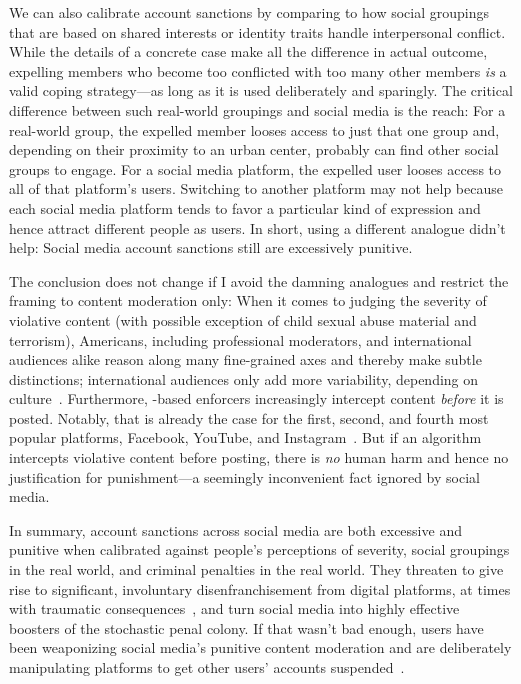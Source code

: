 We can also calibrate account sanctions by comparing to how social groupings
that are based on shared interests or identity traits handle interpersonal
conflict. While the details of a concrete case make all the difference in actual
outcome, expelling members who become too conflicted with too many other members
\emph{is} a valid coping strategy---as long as it is used deliberately and
sparingly. The critical difference between such real-world groupings and social
media is the reach: For a real-world group, the expelled member looses access to
just that one group and, depending on their proximity to an urban center,
probably can find other social groups to engage. For a social media platform,
the expelled user looses access to all of that platform's users. Switching to
another platform may not help because each social media platform tends to favor
a particular kind of expression and hence attract different people as users. In
short, using a different analogue didn't help: Social media account sanctions
still are excessively punitive.

The conclusion does not change if I avoid the damning analogues and restrict
the framing to content moderation only: When it comes to judging the severity of
violative content (with possible exception of child sexual abuse material and
terrorism), Americans, including professional moderators, and international
audiences alike reason along many fine-grained axes and thereby make subtle
distinctions; international audiences only add more variability, depending on
culture~\cite{JiangScheuermanea2021,ScheuermanJiangea2021}. Furthermore,
\AI-based enforcers increasingly intercept content \emph{before} it is posted.
Notably, that is already the case for the first, second, and fourth most popular
platforms, Facebook, YouTube, and Instagram~\cite{Lua2022}. But if an algorithm
intercepts violative content before posting, there is \emph{no} human harm and
hence no justification for punishment---a seemingly inconvenient fact ignored
by social media.

In summary, account sanctions across social media are both excessive and
punitive when calibrated against people's perceptions of severity, social
groupings in the real world, and criminal penalties in the real world. They
threaten to give rise to significant, involuntary disenfranchisement from
digital platforms, at times with traumatic consequences~\cite{Hill2022}, and
turn social media into highly effective boosters of the stochastic penal colony.
If that wasn't bad enough, users have been weaponizing social media's punitive
content moderation and are deliberately manipulating platforms to get other
users' accounts suspended~\cite{SilvermanFortis2023}.


